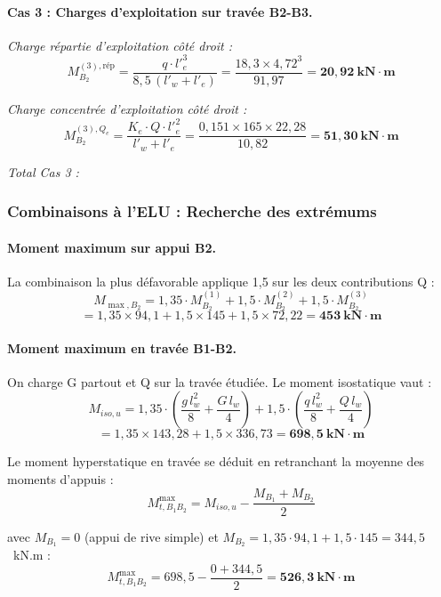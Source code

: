 \paragraph{Cas 3 : Charges d'exploitation sur travée B2-B3.}

\textit{Charge répartie d'exploitation côté droit :}
\[
  M_{B_2}^{(3),\text{rép}} = \frac{q \cdot l'^3_e}{8{,}5\,(l'_w + l'_e)}
  = \frac{18{,}3 \times 4{,}72^3}{91{,}97} = \mathbf{20{,}92~\text{kN}\cdot\text{m}}
\]

\textit{Charge concentrée d'exploitation côté droit :}
\[
  M_{B_2}^{(3),Q_e} = \frac{K_e \cdot Q \cdot l'^2_e}{l'_w + l'_e}
  = \frac{0{,}151 \times 165 \times 22{,}28}{10{,}82} = \mathbf{51{,}30~\text{kN}\cdot\text{m}}
\]

\textit{Total Cas 3 :}

\subsubsection{Combinaisons à l'ELU : Recherche des extrémums}

\paragraph{Moment maximum sur appui B2.}
La combinaison la plus défavorable applique 1,5 sur les deux contributions Q :
\[
  M_{\max,B_2} = 1{,}35 \cdot M_{B_2}^{(1)} + 1{,}5 \cdot M_{B_2}^{(2)} + 1{,}5 \cdot M_{B_2}^{(3)}
\]
\[
  = 1{,}35 \times 94{,}1 + 1{,}5 \times 145 + 1{,}5 \times 72{,}22 = \mathbf{453~\text{kN}\cdot\text{m}}
\]

\paragraph{Moment maximum en travée B1-B2.}
On charge G partout et Q sur la travée étudiée. Le moment isostatique vaut :
\[
  M_{iso,u} = 1{,}35 \cdot \left(\frac{g\,l_w^2}{8} + \frac{G\,l_w}{4}\right) + 1{,}5 \cdot \left(\frac{q\,l_w^2}{8} + \frac{Q\,l_w}{4}\right)
\]
\[
  = 1{,}35 \times 143{,}28 + 1{,}5 \times 336{,}73 = \mathbf{698{,}5~\text{kN}\cdot\text{m}}
\]

Le moment hyperstatique en travée se déduit en retranchant la moyenne des moments d'appuis :
\[
  M_{t,B_1B_2}^{\max} = M_{iso,u} - \frac{M_{B_1} + M_{B_2}}{2}
\]

avec $M_{B_1} = 0$ (appui de rive simple) et $M_{B_2} = 1{,}35 \cdot 94{,}1 + 1{,}5 \cdot 145 = 344{,}5$~kN.m :
\[
  M_{t,B_1B_2}^{\max} = 698{,}5 - \frac{0 + 344{,}5}{2} = \mathbf{526{,}3~\text{kN}\cdot\text{m}}
\]

